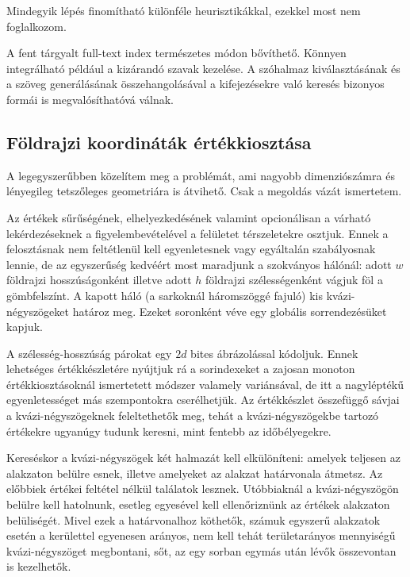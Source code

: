 \documentclass[
    parspace,
    noindent,
    nohyp,
]{elteiktdk}[2023/04/10]
\begin{document}
Mindegyik lépés finomítható különféle heurisztikákkal,
ezekkel most nem foglalkozom.

A fent tárgyalt full-text index természetes módon bővíthető.
Könnyen integrálható például a kizárandó szavak kezelése.
A szóhalmaz kiválasztásának és a szöveg generálásának összehangolásával
a kifejezésekre való keresés bizonyos formái is megvalósíthatóvá válnak.



\subsection{Földrajzi koordináták értékkiosztása}

A legegyszerűbben közelítem meg a problémát,
ami nagyobb dimenziószámra és lényegileg tetszőleges geometriára is átvihető.
Csak a megoldás vázát ismertetem.

Az értékek sűrűségének, elhelyezkedésének valamint opcionálisan a várható lekérdezéseknek a
figyelembevételével a felületet térszeletekre osztjuk.
Ennek a felosztásnak nem feltétlenül kell egyenletesnek vagy egyáltalán szabályosnak lennie,
de az egyszerűség kedvéért most maradjunk a szokványos hálónál:
adott $w$ földrajzi hosszúságonként illetve adott $h$ földrajzi szélességenként vágjuk föl a gömbfelszínt.
A kapott háló (a sarkoknál háromszöggé fajuló) kis kvázi-négyszögeket határoz meg.
Ezeket soronként véve egy globális sorrendezésüket kapjuk.

A szélesség-hosszúság párokat egy $2d$ bites ábrázolással kódoljuk.
Ennek lehetséges értékkészletére nyújtjuk rá a sorindexeket
a zajosan monoton értékkiosztásoknál ismertetett módszer valamely variánsával,
de itt a nagyléptékű egyenletességet más szempontokra cserélhetjük.
Az értékkészlet összefüggő sávjai a kvázi-négyszögeknek feleltethetők meg,
tehát a kvázi-négyszögekbe tartozó értékekre ugyanúgy tudunk keresni,
mint fentebb az időbélyegekre.

Kereséskor a kvázi-négyszögek két halmazát kell elkülöníteni:
amelyek teljesen az alakzaton belülre esnek,
illetve amelyeket az alakzat határvonala átmetsz.
Az előbbiek értékei feltétel nélkül találatok lesznek.
Utóbbiaknál a kvázi-négyszögön belülre kell hatolnunk,
esetleg egyesével kell ellenőriznünk az értékek alakzaton belüliségét.
Mivel ezek a határvonalhoz köthetők,
számuk egyszerű alakzatok esetén a kerülettel egyenesen arányos,
nem kell tehát területarányos mennyiségű kvázi-négyszöget megbontani,
sőt, az egy sorban egymás után lévők összevontan is kezelhetők.
\end{document}

